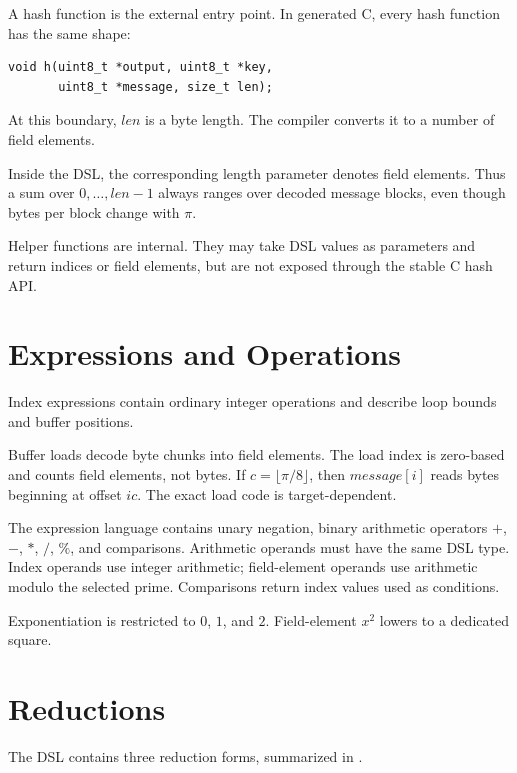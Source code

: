 A hash function is the external entry point. In generated C, every hash function has the same shape:
\begin{lstlisting}[style=thesisC]
void h(uint8_t *output, uint8_t *key,
       uint8_t *message, size_t len);
\end{lstlisting}
At this boundary, \(len\) is a byte length. The compiler converts it to a number of field elements.

Inside the DSL, the corresponding length parameter denotes field elements. Thus a sum over \(0,\ldots,len-1\) always ranges over decoded message blocks, even though bytes per block change with \(\pi\).

Helper functions are internal. They may take DSL values as parameters and return indices or field elements, but are not exposed through the stable C hash API.

\section{Expressions and Operations}
\label{sec:dsl-expressions}

Index expressions contain ordinary integer operations and describe loop bounds and buffer positions.

Buffer loads decode byte chunks into field elements. The load index is zero-based and counts field elements, not bytes. If \(c=\lfloor \pi/8\rfloor\), then \(message[i]\) reads bytes beginning at offset \(ic\). The exact load code is target-dependent.

The expression language contains unary negation, binary arithmetic operators \(+\), \(-\), \(*\), \(/\), \(\%\), and comparisons. Arithmetic operands must have the same DSL type. Index operands use integer arithmetic; field-element operands use arithmetic modulo the selected prime. Comparisons return index values used as conditions.

Exponentiation is restricted to \(0\), \(1\), and \(2\). Field-element \(x^2\) lowers to a dedicated square.

\section{Reductions}
\label{sec:dsl-reductions}

The DSL contains three reduction forms, summarized in .


